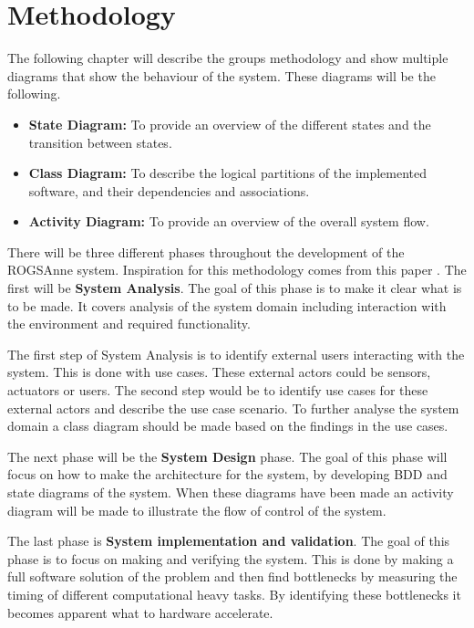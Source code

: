 
\chapter{Methodology}
The following chapter will describe the groups methodology and show multiple diagrams that show the behaviour of the system. These diagrams will be the following.

\begin{itemize}
	\item \textbf{State Diagram:} To provide an overview of the different states and the transition between states.
	
	\item \textbf{Class Diagram:} To describe the logical partitions of the implemented software, and their dependencies and associations.
	
	\item \textbf{Activity Diagram:} To provide an overview of the overall system flow.
\end{itemize}

There will be three different phases throughout the development of the ROGSAnne system. Inspiration for this methodology comes from this paper \cite{A_HW_SW_CodesignMethodology}. The first will be \textbf{System Analysis}. The goal of this phase is to make it clear what is to be made. It covers analysis of the system domain including interaction with the environment and required functionality.

The first step of System Analysis is to identify external users interacting with the system. This is done with use cases. These external actors could be sensors, actuators or users. The second step would be to identify use cases for these external actors and describe the use case scenario. 
To further analyse the system domain a class diagram should be made based on the findings in the use cases.

The next phase will be the \textbf{System Design} phase. The goal of this phase will focus on how to make the architecture for the system, by developing BDD and state diagrams of the system. When these diagrams have been made an activity diagram will be made to illustrate the flow of control of the system.

The last phase is \textbf{System implementation and validation}. The goal of this phase is to focus on making and verifying the system. This is done by making a full software solution of the problem and then find bottlenecks by measuring the timing of different computational heavy tasks. By identifying these bottlenecks it becomes apparent what to hardware accelerate. 
